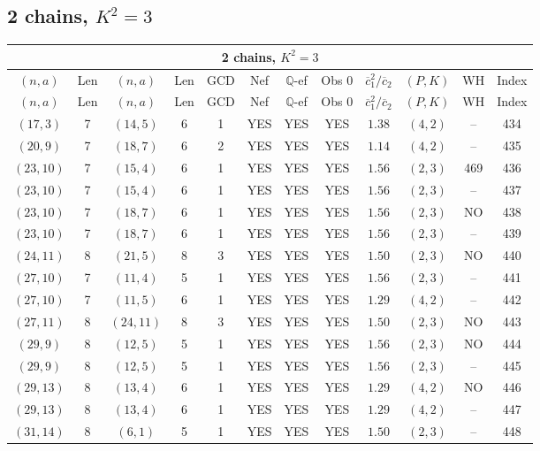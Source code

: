 \subsection{2 chains, $K^2 = 3$}
\begin{longtable}{|c|c|c|c|c|c|c|c|c|c|c|c|}
\hline
\multicolumn{12}{|c|}{2 chains, $K^2 = 3$}\\
\hline
$(n,a)$ & Len & $(n,a)$ & Len & GCD & Nef & $\mathbb Q$-ef & Obs 0 & $\overline c_1^2 / \overline c_2$ & $(P,K)$ & WH & Index\\
\hline
\endfirsthead

\hline
$(n,a)$ & Len & $(n,a)$ & Len & GCD & Nef & $\mathbb Q$-ef & Obs 0 & $\overline c_1^2 / \overline c_2$ & $(P,K)$ & WH & Index\\
\hline
\endhead
\hline
\endfoot

$(17,3)$ & 7 & $(14,5)$ & 6 & 1 & YES & YES & YES & $1.38$ & $(4,2)$ & -- & 434\\
$(20,9)$ & 7 & $(18,7)$ & 6 & 2 & YES & YES & YES & $1.14$ & $(4,2)$ & -- & 435\\
$(23,10)$ & 7 & $(15,4)$ & 6 & 1 & YES & YES & YES & $1.56$ & $(2,3)$ & 469 & 436\\
$(23,10)$ & 7 & $(15,4)$ & 6 & 1 & YES & YES & YES & $1.56$ & $(2,3)$ & -- & 437\\
$(23,10)$ & 7 & $(18,7)$ & 6 & 1 & YES & YES & YES & $1.56$ & $(2,3)$ & NO & 438\\
$(23,10)$ & 7 & $(18,7)$ & 6 & 1 & YES & YES & YES & $1.56$ & $(2,3)$ & -- & 439\\
$(24,11)$ & 8 & $(21,5)$ & 8 & 3 & YES & YES & YES & $1.50$ & $(2,3)$ & NO & 440\\
$(27,10)$ & 7 & $(11,4)$ & 5 & 1 & YES & YES & YES & $1.56$ & $(2,3)$ & -- & 441\\
$(27,10)$ & 7 & $(11,5)$ & 6 & 1 & YES & YES & YES & $1.29$ & $(4,2)$ & -- & 442\\
$(27,11)$ & 8 & $(24,11)$ & 8 & 3 & YES & YES & YES & $1.50$ & $(2,3)$ & NO & 443\\
$(29,9)$ & 8 & $(12,5)$ & 5 & 1 & YES & YES & YES & $1.56$ & $(2,3)$ & NO & 444\\
$(29,9)$ & 8 & $(12,5)$ & 5 & 1 & YES & YES & YES & $1.56$ & $(2,3)$ & -- & 445\\
$(29,13)$ & 8 & $(13,4)$ & 6 & 1 & YES & YES & YES & $1.29$ & $(4,2)$ & NO & 446\\
$(29,13)$ & 8 & $(13,4)$ & 6 & 1 & YES & YES & YES & $1.29$ & $(4,2)$ & -- & 447\\
$(31,14)$ & 8 & $(6,1)$ & 5 & 1 & YES & YES & YES & $1.50$ & $(2,3)$ & -- & 448\\

\end{longtable}
